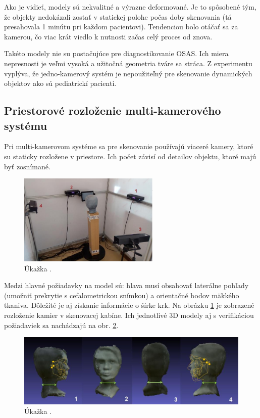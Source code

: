 Ako je vidieť, modely sú nekvalitné a výrazne deformované. Je to spôsobené tým, že objekty nedokázali zostať v statickej polohe počas doby skenovania (tá presahovala 1 minútu pri každom pacientovi). Tendenciou bolo otáčať sa za kamerou, čo viac krát viedlo k nutnosti začas celý proces od znova. 

Takéto modely nie su postačujúce pre diagnostikovanie OSAS. Ich miera nepresnosti je veľmi vysoká a užitočná geometria tváre sa stráca. Z experimentu vyplýva, že jedno-kamerový systém je nepoužiteľný pre skenovanie dynamických objektov ako sú pediatrickí pacienti.  

\subsection{Priestorové rozloženie multi-kamerového systému}

Pri multi-kamerovom systéme sa pre skenovanie používajú viaceré kamery, ktoré su staticky rozložene v priestore. Ich počet závisí od detailov objektu, ktoré majú byť zosnímané.

\begin{figure}[H]
	\centering
	\includegraphics[width=0.6\textwidth]{figures/multicam_placement.png}
	\caption{Úkažka .}
	\label{fig:multicam:placement}
\end{figure}


Medzi hlavné požiadavky na model sú: hlava musí obsahovať laterálne pohľady (umožniť prekrytie s cefalometrickou snímkou) a orientačné bodov mäkkého tkaniva. Dôležité je aj získanie informácie o šírke krk. Na obrázku \ref{fig:multicam:placement} je zobrazené rozloženie kamier v skenovacej kabíne. Ich jednotlivé 3D modely aj s verifikáciou požiadaviek sa nachádzajú na obr. \ref{fig:multicam:models}. 

\begin{figure}[H]
	\centering
	\includegraphics[width=\textwidth]{figures/multicam_placement_scans.png}
	\caption{Úkažka .}
	\label{fig:multicam:models}
\end{figure}

